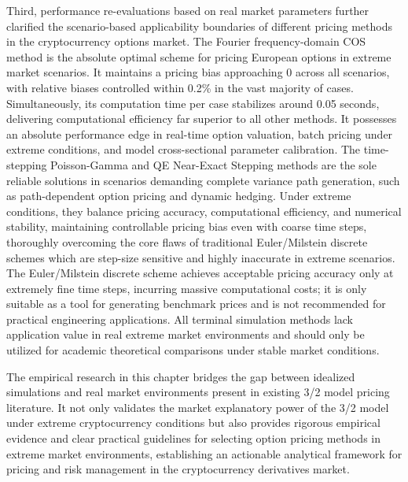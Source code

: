 Third, performance re-evaluations based on real market parameters further clarified the scenario-based applicability boundaries of different pricing methods in the cryptocurrency options market. The Fourier frequency-domain COS method is the absolute optimal scheme for pricing European options in extreme market scenarios. It maintains a pricing bias approaching 0 across all scenarios, with relative biases controlled within 0.2\% in the vast majority of cases. Simultaneously, its computation time per case stabilizes around 0.05 seconds, delivering computational efficiency far superior to all other methods. It possesses an absolute performance edge in real-time option valuation, batch pricing under extreme conditions, and model cross-sectional parameter calibration. The time-stepping Poisson-Gamma and QE Near-Exact Stepping methods are the sole reliable solutions in scenarios demanding complete variance path generation, such as path-dependent option pricing and dynamic hedging. Under extreme conditions, they balance pricing accuracy, computational efficiency, and numerical stability, maintaining controllable pricing bias even with coarse time steps, thoroughly overcoming the core flaws of traditional Euler/Milstein discrete schemes which are step-size sensitive and highly inaccurate in extreme scenarios. The Euler/Milstein discrete scheme achieves acceptable pricing accuracy only at extremely fine time steps, incurring massive computational costs; it is only suitable as a tool for generating benchmark prices and is not recommended for practical engineering applications. All terminal simulation methods lack application value in real extreme market environments and should only be utilized for academic theoretical comparisons under stable market conditions.

The empirical research in this chapter bridges the gap between idealized simulations and real market environments present in existing 3/2 model pricing literature. It not only validates the market explanatory power of the 3/2 model under extreme cryptocurrency conditions but also provides rigorous empirical evidence and clear practical guidelines for selecting option pricing methods in extreme market environments, establishing an actionable analytical framework for pricing and risk management in the cryptocurrency derivatives market.